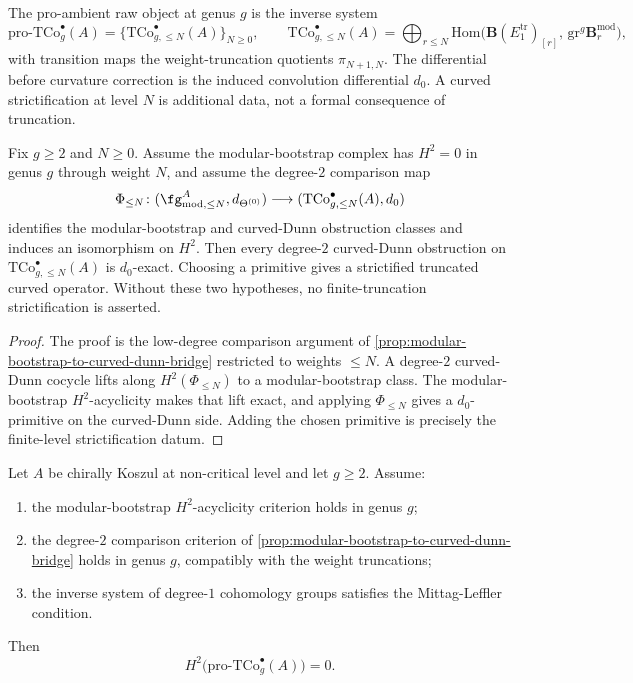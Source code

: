 \begin{definition}
\label{def:pro-curved-dunn}
The pro-ambient raw object at genus \(g\) is the inverse system
\[
 \mathrm{pro}\text{-}\mathrm{TCo}^{\bullet}_{g}(A)
 =
 \bigl\{\mathrm{TCo}^{\bullet}_{g,\le N}(A)\bigr\}_{N\ge0},
 \qquad
 \mathrm{TCo}^{\bullet}_{g,\le N}(A)
 =
 \bigoplus_{r\le N}
 \mathrm{Hom}\!\bigl(
 \mathbf{B}(E_{1}^{\mathrm{tr}})_{[r]},\,
 \mathrm{gr}^{g}\mathbf{B}^{\mathrm{mod}}_{r}\bigr),
\]
with transition maps the weight-truncation quotients
\(\pi_{N+1,N}\). The differential before curvature correction is
the induced convolution differential \(d_{0}\). A curved
strictification at level \(N\) is additional data, not a formal
consequence of truncation.
\end{definition}

\begin{lemma}
\label{lem:finite-truncation-is-complex}
Fix \(g\ge2\) and \(N\ge0\). Assume the modular-bootstrap complex
has \(H^{2}=0\) in genus \(g\) through weight \(N\), and assume the
degree-\(2\) comparison map
\[
 \Phi_{\le N}\colon
 (\fg^{A}_{\mathrm{mod},\le N},d_{\Theta^{(0)}})
 \longrightarrow
 (\mathrm{TCo}^{\bullet}_{g,\le N}(A),d_{0})
\]
identifies the modular-bootstrap and curved-Dunn obstruction
classes and induces an isomorphism on \(H^{2}\). Then every
degree-\(2\) curved-Dunn obstruction on
\(\mathrm{TCo}^{\bullet}_{g,\le N}(A)\) is \(d_{0}\)-exact.
Choosing a primitive gives a strictified truncated curved operator.
Without these two hypotheses, no finite-truncation strictification is
asserted.
\end{lemma}

\begin{proof}
The proof is the low-degree comparison argument of
\autoref{prop:modular-bootstrap-to-curved-dunn-bridge} restricted to
weights \(\le N\). A degree-\(2\) curved-Dunn cocycle lifts
along \(H^{2}(\Phi_{\le N})\) to a modular-bootstrap class. The
modular-bootstrap \(H^{2}\)-acyclicity makes that lift exact, and
applying \(\Phi_{\le N}\) gives a \(d_{0}\)-primitive on the
curved-Dunn side. Adding the chosen primitive is precisely the
finite-level strictification datum.
\end{proof}

\begin{theorem}
\label{thm:curved-dunn-pro-ambient-H2-zero}
Let \(A\) be chirally Koszul at non-critical level and let
\(g\ge2\). Assume:
\begin{enumerate}
\item the modular-bootstrap \(H^{2}\)-acyclicity criterion holds in
genus \(g\);
\item the degree-\(2\) comparison criterion of
\autoref{prop:modular-bootstrap-to-curved-dunn-bridge} holds in
genus \(g\), compatibly with the weight truncations;
\item the inverse system of degree-\(1\) cohomology groups satisfies
the Mittag-Leffler condition.
\end{enumerate}
Then
\[
 H^{2}\bigl(\mathrm{pro}\text{-}\mathrm{TCo}^{\bullet}_{g}(A)\bigr)
 =0.
\]
\end{theorem}

